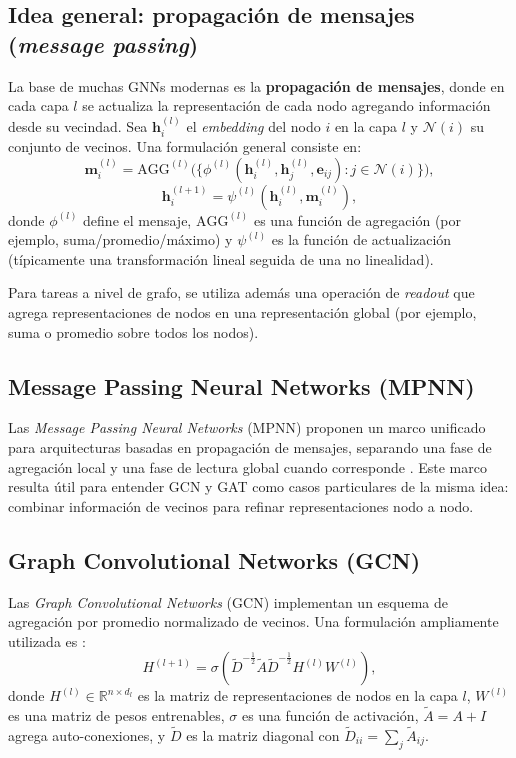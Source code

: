 \subsection{Idea general: propagación de mensajes (\textit{message passing})}

La base de muchas GNNs modernas es la \textbf{propagación de mensajes}, donde en cada capa $l$ se actualiza la representación de cada nodo agregando información desde su vecindad. Sea $\mathbf{h}_i^{(l)}$ el \textit{embedding} del nodo $i$ en la capa $l$ y $\mathcal{N}(i)$ su conjunto de vecinos. Una formulación general consiste en:
\[
\mathbf{m}_i^{(l)}=\mathrm{AGG}^{(l)}\Big(\big\{\phi^{(l)}(\mathbf{h}_i^{(l)},\mathbf{h}_j^{(l)},\mathbf{e}_{ij}) : j\in\mathcal{N}(i)\big\}\Big),
\]
\[
\mathbf{h}_i^{(l+1)}=\psi^{(l)}(\mathbf{h}_i^{(l)},\mathbf{m}_i^{(l)}),
\]
donde $\phi^{(l)}$ define el mensaje, $\mathrm{AGG}^{(l)}$ es una función de agregación (por ejemplo, suma/promedio/máximo) y $\psi^{(l)}$ es la función de actualización (típicamente una transformación lineal seguida de una no linealidad).

Para tareas a nivel de grafo, se utiliza además una operación de \textit{readout} que agrega representaciones de nodos en una representación global (por ejemplo, suma o promedio sobre todos los nodos).

\subsection{Message Passing Neural Networks (MPNN)}

Las \textit{Message Passing Neural Networks} (MPNN) proponen un marco unificado para arquitecturas basadas en propagación de mensajes, separando una fase de agregación local y una fase de lectura global cuando corresponde \cite{mpnn}. Este marco resulta útil para entender GCN y GAT como casos particulares de la misma idea: combinar información de vecinos para refinar representaciones nodo a nodo.

\subsection{Graph Convolutional Networks (GCN)}

Las \textit{Graph Convolutional Networks} (GCN) implementan un esquema de agregación por promedio normalizado de vecinos. Una formulación ampliamente utilizada es \cite{GCN-formula}:
\[
H^{(l+1)}=\sigma\left(\tilde{D}^{-\frac{1}{2}}\tilde{A}\tilde{D}^{-\frac{1}{2}}H^{(l)}W^{(l)}\right),
\]
donde $H^{(l)}\in\mathbb{R}^{n\times d_l}$ es la matriz de representaciones de nodos en la capa $l$, $W^{(l)}$ es una matriz de pesos entrenables, $\sigma$ es una función de activación, $\tilde{A}=A+I$ agrega auto-conexiones, y $\tilde{D}$ es la matriz diagonal con $\tilde{D}_{ii}=\sum_j \tilde{A}_{ij}$.

